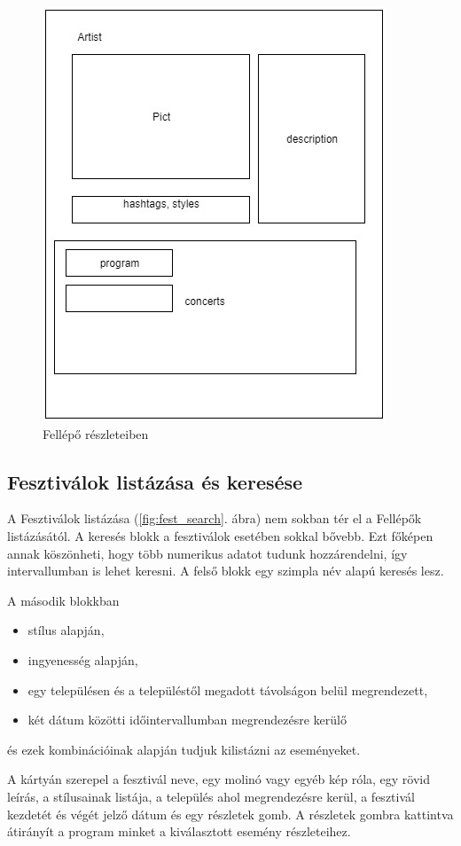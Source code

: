 \begin{figure}
\centering
\includegraphics[scale=0.5]{kepek/artist_details.jpg}
\caption{Fellépő részleteiben}
\label{fig:artist_details}
\end{figure}

\subsection{Fesztiválok listázása és keresése}
A Fesztiválok listázása (\ref{fig:fest_search}. ábra) nem sokban tér el a Fellépők listázásától. A keresés blokk a fesztiválok esetében sokkal bővebb. Ezt főképen annak köszönheti, hogy több numerikus adatot tudunk hozzárendelni, így intervallumban is lehet keresni.
A felső blokk egy szimpla név alapú keresés lesz. 

A második blokkban
\begin{itemize}
\item stílus alapján,
\item ingyenesség alapján,
\item egy településen és a településtől megadott távolságon belül megrendezett, 
\item két dátum közötti időintervallumban megrendezésre kerülő
\end{itemize}
és ezek kombinációinak alapján tudjuk kilistázni az eseményeket.

A kártyán szerepel a fesztivál neve, egy molinó vagy egyéb kép róla, egy rövid leírás, a stílusainak listája, a település ahol megrendezésre kerül, a  fesztivál kezdetét és végét jelző dátum és egy részletek gomb. A részletek gombra kattintva átirányít a program minket a kiválasztott esemény részleteihez.

